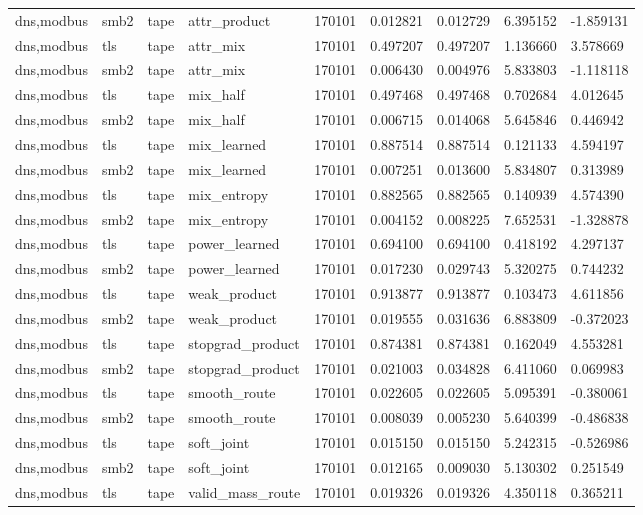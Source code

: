 \begin{tabular}{lllllllll}
dns,modbus & smb2 & tape & attr\_product & 170101 & 0.012821 & 0.012729 & 6.395152 & -1.859131 \\
dns,modbus & tls & tape & attr\_mix & 170101 & 0.497207 & 0.497207 & 1.136660 & 3.578669 \\
dns,modbus & smb2 & tape & attr\_mix & 170101 & 0.006430 & 0.004976 & 5.833803 & -1.118118 \\
dns,modbus & tls & tape & mix\_half & 170101 & 0.497468 & 0.497468 & 0.702684 & 4.012645 \\
dns,modbus & smb2 & tape & mix\_half & 170101 & 0.006715 & 0.014068 & 5.645846 & 0.446942 \\
dns,modbus & tls & tape & mix\_learned & 170101 & 0.887514 & 0.887514 & 0.121133 & 4.594197 \\
dns,modbus & smb2 & tape & mix\_learned & 170101 & 0.007251 & 0.013600 & 5.834807 & 0.313989 \\
dns,modbus & tls & tape & mix\_entropy & 170101 & 0.882565 & 0.882565 & 0.140939 & 4.574390 \\
dns,modbus & smb2 & tape & mix\_entropy & 170101 & 0.004152 & 0.008225 & 7.652531 & -1.328878 \\
dns,modbus & tls & tape & power\_learned & 170101 & 0.694100 & 0.694100 & 0.418192 & 4.297137 \\
dns,modbus & smb2 & tape & power\_learned & 170101 & 0.017230 & 0.029743 & 5.320275 & 0.744232 \\
dns,modbus & tls & tape & weak\_product & 170101 & 0.913877 & 0.913877 & 0.103473 & 4.611856 \\
dns,modbus & smb2 & tape & weak\_product & 170101 & 0.019555 & 0.031636 & 6.883809 & -0.372023 \\
dns,modbus & tls & tape & stopgrad\_product & 170101 & 0.874381 & 0.874381 & 0.162049 & 4.553281 \\
dns,modbus & smb2 & tape & stopgrad\_product & 170101 & 0.021003 & 0.034828 & 6.411060 & 0.069983 \\
dns,modbus & tls & tape & smooth\_route & 170101 & 0.022605 & 0.022605 & 5.095391 & -0.380061 \\
dns,modbus & smb2 & tape & smooth\_route & 170101 & 0.008039 & 0.005230 & 5.640399 & -0.486838 \\
dns,modbus & tls & tape & soft\_joint & 170101 & 0.015150 & 0.015150 & 5.242315 & -0.526986 \\
dns,modbus & smb2 & tape & soft\_joint & 170101 & 0.012165 & 0.009030 & 5.130302 & 0.251549 \\
dns,modbus & tls & tape & valid\_mass\_route & 170101 & 0.019326 & 0.019326 & 4.350118 & 0.365211 \\

\end{tabular}

